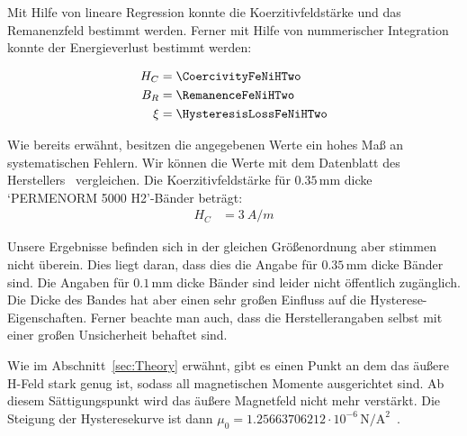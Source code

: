 \documentclass[a4paper,10pt,twocolumn]{article}
\newcommand{\stripThickness}{$0.1 \, \text{mm}$ }
\begin{document}
    Mit Hilfe von lineare Regression konnte die Koerzitivfeldstärke und das Remanenzfeld bestimmt werden.
    Ferner mit Hilfe von nummerischer Integration konnte der Energieverlust bestimmt werden:

    \begin{align*}
        H_C &= \CoercivityFeNiHTwo \\
        B_R &= \RemanenceFeNiHTwo \\
        \xi &= \HysteresisLossFeNiHTwo
    \end{align*}

    Wie bereits erwähnt, besitzen die angegebenen Werte ein hohes Maß an systematischen Fehlern.
    Wir können die Werte mit dem Datenblatt des Herstellers~\cite{feniDatasheet} vergleichen.
    Die Koerzitivfeldstärke für $0.35\,\text{mm}$ dicke `PERMENORM 5000 H2'-Bänder beträgt:
    \begin{align*}
        H_C &= 3 \ A/m
    \end{align*}
%    
%    

    Unsere Ergebnisse befinden sich in der gleichen Größenordnung aber stimmen nicht überein.
    Dies liegt daran, dass dies die Angabe für $0.35\,\text{mm}$ dicke Bänder sind.
    Die Angaben für \stripThickness dicke Bänder sind leider nicht öffentlich zugänglich.
    Die Dicke des Bandes hat aber einen sehr großen Einfluss auf die Hysterese-Eigenschaften.
    Ferner beachte man auch, dass die Herstellerangaben selbst mit einer großen Unsicherheit behaftet sind.

    Wie im Abschnitt~\ref{sec:Theory} erwähnt, gibt es einen Punkt an dem das äußere H-Feld stark genug ist,
    sodass all magnetischen Momente ausgerichtet sind.
    Ab diesem Sättigungspunkt wird das äußere Magnetfeld nicht mehr verstärkt.
    Die Steigung der Hysteresekurve ist dann $\mu_0 = 1.25663706212\cdot 10^{-6} \, \mathrm{N/A^2}$~\cite{codata}.
\end{document}
